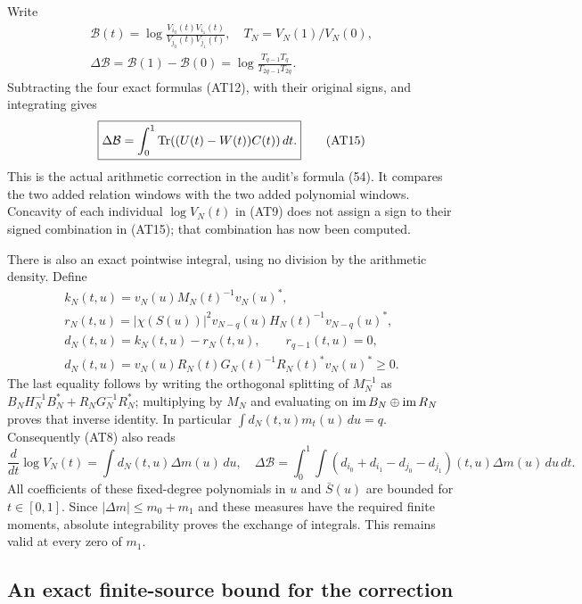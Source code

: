 Write
\[
 \begin{gathered}
 \mathcal B(t)=\log\frac{V_{i_0}(t)V_{i_1}(t)}{V_{j_0}(t)V_{j_1}(t)},
 \quad T_N=V_N(1)/V_N(0),\\
 \Delta\mathcal B=\mathcal B(1)-\mathcal B(0)
 =\log\frac{T_{q-1}T_q}{T_{2q-1}T_{2q}}.       \end{gathered}
 \tag{AT14}
\]
Subtracting the four exact formulas (AT12), with their original
signs, and integrating gives
\[
 \boxed{\displaystyle
 \Delta\mathcal B=\int_0^1\operatorname{Tr}((U(t)-W(t))C(t))\,dt .}
                                                        \tag{AT15}
\]
This is the actual arithmetic correction in the audit's formula
(54). It compares the two added relation windows with the two
added polynomial windows. Concavity of each individual
$\log V_N(t)$ in (AT9) does not assign a sign to their signed
combination in (AT15); that combination has now been computed.

There is also an exact pointwise integral, using no division by
the arithmetic density. Define
\[
 \begin{gathered}
 k_N(t,u)=v_N(u)M_N(t)^{-1}v_N(u)^*,\\
 r_N(t,u)=|\chi(S(u))|^2
 v_{N-q}(u)H_N(t)^{-1}v_{N-q}(u)^*,\\
 d_N(t,u)=k_N(t,u)-r_N(t,u),\qquad r_{q-1}(t,u)=0,\\
 d_N(t,u)=v_N(u)R_N(t)G_N(t)^{-1}R_N(t)^*v_N(u)^*\ge0.
                                                        \end{gathered}
 \tag{AT16}
\]
The last equality follows by writing the orthogonal splitting
of $M_N^{-1}$ as
$B_NH_N^{-1}B_N^*+R_NG_N^{-1}R_N^*$; multiplying by $M_N$
and evaluating on $\operatorname{im} B_N\oplus\operatorname{im} R_N$ proves that inverse
identity. In particular $\int d_N(t,u)m_t(u)\,du=q$.
Consequently (AT8) also reads
\[
 \frac{d}{dt}\log V_N(t)=\int d_N(t,u)\Delta m(u)\,du,
\quad
 \Delta\mathcal B=\int_0^1\int
 (d_{i_0}+d_{i_1}-d_{j_0}-d_{j_1})(t,u)\Delta m(u)\,du\,dt.
                                                        \tag{AT17}
\]
All coefficients of these fixed-degree polynomials in $u$ and
$\bar S(u)$ are bounded for $t\in[0,1]$. Since
$|\Delta m|\le m_0+m_1$ and these measures have the required
finite moments, absolute integrability proves the exchange of
integrals. This remains valid at every zero of $m_1$.

\subsection{An exact finite-source bound for the correction}


